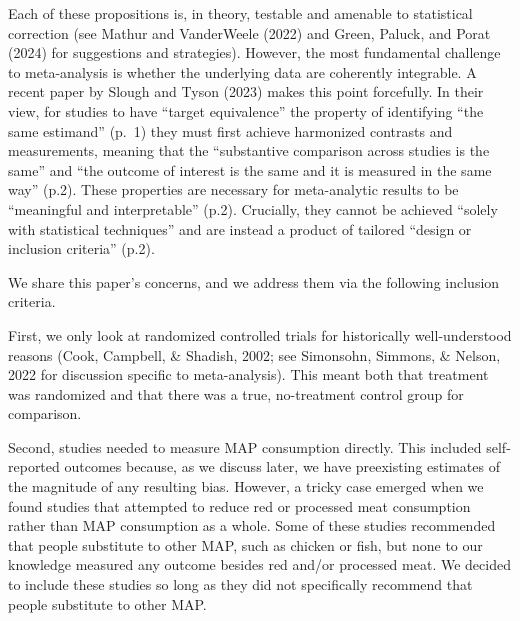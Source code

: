 \documentclass[
  man]{apa6}
\begin{document}
Each of these propositions is, in theory, testable and amenable to statistical correction (see Mathur and VanderWeele (2022) and Green, Paluck, and Porat (2024) for suggestions and strategies). However, the most fundamental challenge to meta-analysis is whether the underlying data are coherently integrable. A recent paper by Slough and Tyson (2023) makes this point forcefully. In their view, for studies to have ``target equivalence'' \textemdash the property of identifying ``the same estimand'' (p.~1) \textemdash they must first achieve harmonized contrasts and measurements, meaning that the ``substantive comparison across studies is the same'' and ``the outcome of interest is the same and it is measured in the same way'' (p.2). These properties are necessary for meta-analytic results to be ``meaningful and interpretable'' (p.2). Crucially, they cannot be achieved ``solely with statistical techniques'' and are instead a product of tailored ``design or inclusion criteria'' (p.2).

We share this paper's concerns, and we address them via the following inclusion criteria.

First, we only look at randomized controlled trials for historically well-understood reasons (Cook, Campbell, \& Shadish, 2002; see Simonsohn, Simmons, \& Nelson, 2022 for discussion specific to meta-analysis). This meant both that treatment was randomized and that there was a true, no-treatment control group for comparison.

Second, studies needed to measure MAP consumption directly. This included self-reported outcomes because, as we discuss later, we have preexisting estimates of the magnitude of any resulting bias. However, a tricky case emerged when we found studies that attempted to reduce red or processed meat consumption rather than MAP consumption as a whole. Some of these studies recommended that people substitute to other MAP, such as chicken or fish, but none to our knowledge measured any outcome besides red and/or processed meat. We decided to include these studies so long as they did not specifically recommend that people substitute to other MAP.
\end{document}
